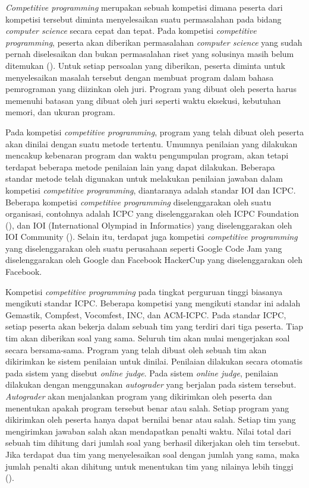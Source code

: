 \par \textit{Competitive programming} merupakan sebuah kompetisi dimana peserta dari kompetisi tersebut diminta menyelesaikan suatu permasalahan pada bidang \textit{computer science} secara cepat dan tepat. Pada kompetisi \textit{competitive programming}, peserta akan diberikan permasalahan \textit{computer science} yang sudah pernah diselesaikan dan bukan permasalahan riset yang solusinya masih belum ditemukan (\cite{halimsfcp3}). Untuk setiap persoalan yang diberikan, peserta diminta untuk menyelesaikan masalah tersebut dengan membuat program dalam bahasa pemrograman yang diizinkan oleh juri. Program yang dibuat oleh peserta harus memenuhi batasan yang dibuat oleh juri seperti waktu eksekusi, kebutuhan memori, dan ukuran program.
\par Pada kompetisi \textit{competitive programming}, program yang telah dibuat oleh peserta akan dinilai dengan suatu metode tertentu. Umumnya penilaian yang dilakukan mencakup kebenaran program dan waktu pengumpulan program, akan tetapi terdapat beberapa metode penilaian lain yang dapat dilakukan. Beberapa standar metode telah digunakan untuk melakukan penilaian jawaban dalam kompetisi \textit{competitive programming}, diantaranya adalah standar IOI dan ICPC. Beberapa kompetisi \textit{competitive programming} diselenggarakan oleh suatu organisasi, contohnya adalah ICPC yang diselenggarakan oleh ICPC Foundation (\cite{abouticpc}), dan IOI (International Olympiad in Informatics) yang diselenggarakan oleh IOI Community (\cite{ioiorg}). Selain itu, terdapat juga kompetisi \textit{competitive programming} yang diselenggarakan oleh suatu perusahaan seperti Google Code Jam yang diselenggarakan oleh Google dan Facebook HackerCup yang diselenggarakan oleh Facebook.
\par Kompetisi \textit{competitive programming} pada tingkat perguruan tinggi biasanya mengikuti standar ICPC. Beberapa kompetisi yang mengikuti standar ini adalah Gemastik, Compfest, Vocomfest, INC, dan ACM-ICPC. Pada standar ICPC, setiap peserta akan bekerja dalam sebuah tim yang terdiri dari tiga peserta. Tiap tim akan diberikan soal yang sama. Seluruh tim akan mulai mengerjakan soal secara bersama-sama. Program yang telah dibuat oleh sebuah tim akan dikirimkan ke sistem penilaian untuk dinilai. Penilaian dilakukan secara otomatis pada sistem yang disebut \textit{online judge}. Pada sistem \textit{online judge}, penilaian dilakukan dengan menggunakan \textit{autograder} yang berjalan pada sistem tersebut. \textit{Autograder} akan menjalankan program yang dikirimkan oleh peserta dan menentukan apakah program tersebut benar atau salah. Setiap program yang dikirimkan oleh peserta hanya dapat bernilai benar atau salah. Setiap tim yang mengirimkan jawaban salah akan mendapatkan penalti waktu. Nilai total dari sebuah tim dihitung dari jumlah soal yang berhasil dikerjakan oleh tim tersebut. Jika terdapat dua tim yang menyelesaikan soal dengan jumlah yang sama, maka jumlah penalti akan dihitung untuk menentukan tim yang nilainya lebih tinggi (\cite{wfrules}).
